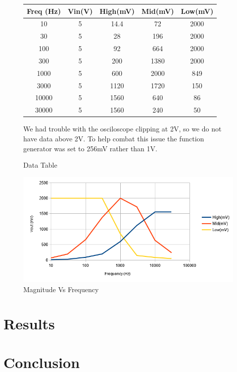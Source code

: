 \documentclass{article}
\begin{document}
\begin{figure}[!ht]
\caption{Data Table}
\begin{center}
\begin{tabular}{|c|c|c|c|c|}
\hline
Freq (Hz)&Vin(V)&High(mV)&Mid(mV)&Low(mV)\\
\hline
10&5&14.4&72&2000\\
\hline
30&5&28&196&2000\\
\hline
100&5&92&664&2000\\
\hline
300&5&200&1380&2000\\
\hline
1000&5&600&2000&849\\
\hline
3000&5&1120&1720&150\\
\hline
10000&5&1560&640&86\\
\hline
30000&5&1560&240&50\\
\hline
\end{tabular}
\begin{flushleft}
We had trouble with the osciloscope clipping at 2V, so we do not have data above 2V. To help combat this issue the function generator was set to 256mV rather than 1V.
\end{flushleft}
\end{center}
\end{figure}
\begin{figure}[!h]
\centering
\caption{Magnitude Vs Frequency}
\includegraphics[width=\linewidth]{magnitudevsfrequency}
\end{figure}
\section*{Results}

\section*{Conclusion}
\end{document}
